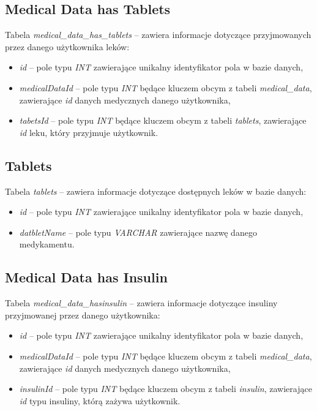 \subsection{Medical Data has Tablets}
Tabela \textit{medical\_data\_has\_tablets} -- zawiera informacje dotyczące przyjmowanych przez danego użytkownika leków:
\begin{itemize}
	\item \textit{id} -- pole typu \textit{INT} zawierające unikalny identyfikator pola w bazie danych,
	\item \textit{medicalDataId} -- pole typu \textit{INT} będące kluczem obcym z tabeli \textit{medical\_data}, zawierające \textit{id} danych medycznych danego użytkownika,
	\item \textit{tabetsId} -- pole typu \textit{INT} będące kluczem obcym z tabeli \textit{tablets}, zawierające \textit{id} leku, który przyjmuje użytkownik.
\end{itemize}

\subsection{Tablets}
Tabela \textit{tablets} -- zawiera informacje dotyczące dostępnych leków w bazie danych:
\begin{itemize}
	\item \textit{id} -- pole typu \textit{INT} zawierające unikalny identyfikator pola w bazie danych,
	\item \textit{datbletName} -- pole typu \textit{VARCHAR} zawierające nazwę danego medykamentu.
\end{itemize}

\subsection{Medical Data has Insulin}
Tabela \textit{medical\_data\_hasinsulin} -- zawiera informacje dotyczące insuliny przyjmowanej przez danego użytkownika:
\begin{itemize}
	\item \textit{id} -- pole typu \textit{INT} zawierające unikalny identyfikator pola w bazie danych,
	\item \textit{medicalDataId} -- pole typu \textit{INT} będące kluczem obcym z tabeli \textit{medical\_data}, zawierające \textit{id} danych medycznych danego użytkownika,
	\item \textit{insulinId} -- pole typu \textit{INT} będące kluczem obcym z tabeli \textit{insulin}, zawierające \textit{id} typu insuliny, którą zażywa użytkownik.
\end{itemize}

